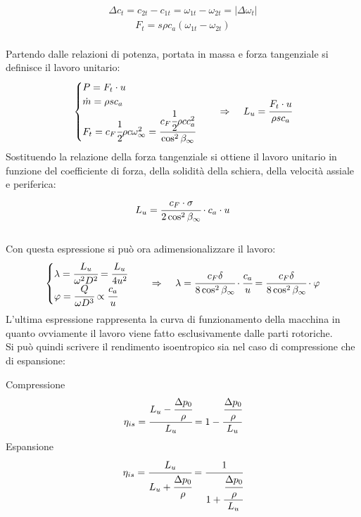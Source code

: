 \begin{align*}
\Delta c_t = c_{2t} - c_{1t} = \omega_{1t} - \omega_{2t} = |\Delta \omega_t |
\end{align*}
\begin{align*}
F_t = s \rho c_a (\omega_{1t} - \omega_{2t})
\end{align*}
\\Partendo dalle relazioni di potenza, portata in massa e forza tangenziale si definisce il lavoro unitario:
\begin{align*}
\begin{cases}
P=F_t \cdot u\\
\dot{m} = \rho s c_a\\
F_t = c_F \cfrac{1}{2} \rho c \omega_{\infty}^2 = \cfrac{c_F \cfrac{1}{2} \rho c c_a^2}{\cos^2 \beta_{\infty}}
\end{cases} \;\;\;\;
\Rightarrow \;\;\;\;
L_u = \cfrac{F_t \cdot u}{\rho s c_a}
\end{align*}
Sostituendo la relazione della forza tangenziale si ottiene il lavoro unitario in funzione del coefficiente di forza, della solidità della schiera, della velocità assiale e periferica:
\begin{align*}
L_u = \cfrac{c_F \cdot \sigma}{2 \cos^2 \beta_{\infty}} \cdot c_a \cdot u
\end{align*}
\\Con questa espressione si può ora adimensionalizzare il lavoro:
\begin{align*}
\begin{cases}
\lambda = \cfrac{L_u}{\omega ^2 D^2} = \cfrac{L_u}{4 u^2}\\
\varphi = \cfrac{Q}{\omega D^3} \propto \cfrac{c_a}{u}
\end{cases} \;\;\;\;
\Rightarrow \;\;\;\;
\lambda = \cfrac{c_F \delta}{8 \cos^2 \beta_{\infty}} \cdot \cfrac{c_a}{u} = \cfrac{c_F \delta}{8 \cos^2 \beta_{\infty}} \cdot \varphi
\end{align*}
L'ultima espressione rappresenta la curva di funzionamento della macchina in quanto ovviamente il lavoro viene fatto esclusivamente dalle parti rotoriche.\\
Si può quindi scrivere il rendimento isoentropico sia nel caso di compressione che di espansione:
\begin{multicols}{2}
Compressione
\begin{align*}
\eta_{is} = \cfrac{L_u - \cfrac{\Delta p_0}{\rho}}{L_u} = 1- \cfrac{\cfrac{\Delta p_0}{\rho}}{L_u}
\end{align*}
\break
Espansione
\begin{align*}
\eta_{is} = \cfrac{L_u}{L_u + \cfrac{\Delta p_0}{\rho}} = \cfrac{1}{1+\cfrac{\cfrac{\Delta p_0}{\rho}}{L_u}}
\end{align*}
\end{multicols}
